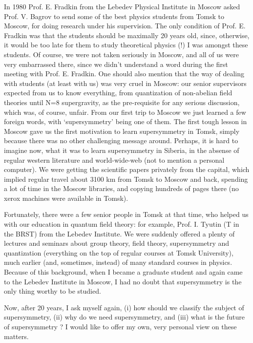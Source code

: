 \documentclass[a4paper,a4paper]{article}
\begin{document}
In 1980 Prof. E. Fradkin from the Lebedev Physical Institute in Moscow asked 
Prof. V. Bagrov to send some of the best physics students from Tomsk to 
Moscow, for doing research under his supervision. The only condition of 
Prof. E. Fradkin was that the students should be maximally 20 years old, 
since, otherwise, it would be too late for them to study theoretical physics 
(!) I was amongst these students. Of course, we were not taken seriously in
Moscow, and all of us were very embarrassed there, since we didn't understand 
a word during the first meeting with Prof. E. Fradkin. One should also mention
 that the way of dealing with students (at least with us) was very cruel in 
Moscow: our senior supervisors expected from us to know everything, 
from quantization of non-abelian field theories until N=8 supergravity, as the
 pre-requisite for any serious discussion, which was, of course, unfair. From 
our first trip to Moscow we just learned a few foreign words, with 
`supersymmetry' being one of them. The first tough lesson in Moscow gave us 
the first motivation to learn supersymmetry in Tomsk, simply because there was
 no other challenging message around. Perhaps, it is hard to imagine now, 
what it was to learn supersymmetry in Siberia, in the absense 
of regular western literature and world-wide-web (not to mention a personal
computer). We were getting the scientific papers privately from the capital, 
which implied regular travel about 3100 km from Tomsk to Moscow and back, 
spending a lot of time in the Moscow libraries, and copying hundreds of pages 
there (no xerox machines were available in Tomsk).  

Fortunately, there were a few senior people in Tomsk at that time, who helped 
us with our education in quantum field theory: for example, Prof. I. Tyutin 
(T in the BRST) from the Lebedev Institute. We were suddenly offered  a plenty
 of lectures and seminars about group theory, field theory, supersymmetry 
and quantization (everything on the top of regular courses at Tomsk 
University), much earlier (and, sometimes, instead) of many standard courses in
 physics. Because of this background, when I became a graduate student 
and again came to the Lebedev Institute in Moscow, I had no doubt that 
supersymmetry is the only thing worthy to be studied.

Now, after 20 years, I ask myself again, (i) how should we classify the subject
of supersymmetry, (ii) why do we need supersymmetry, and (iii) what is the 
future of supersymmetry ? I would like to offer my own, very personal view on 
these matters.  
\end{document}
